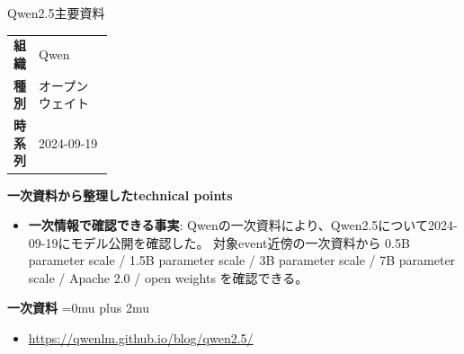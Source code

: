 \begin{technicalnote}{Qwen2.5}{主要資料}
\begingroup
\begin{tabularx}{\linewidth}{@{}>{\bfseries}p{0.22\linewidth}X@{}}
組織 & Qwen \\
種別 & オープンウェイト \\
時系列 & 2024-09-19 \\
\end{tabularx}
\smallskip
{\bfseries 一次資料から整理したtechnical points}
\begin{itemize}[leftmargin=1.5em,itemsep=0.35em]
\item \textbf{一次情報で確認できる事実}: Qwenの一次資料により、Qwen2.5について2024-09-19にモデル公開を確認した。 対象event近傍の一次資料から 0.5B parameter scale / 1.5B parameter scale / 3B parameter scale / 7B parameter scale / Apache 2.0 / open weights を確認できる。
\end{itemize}
\begin{minipage}{\linewidth}
\begin{samepage}
{\bfseries 一次資料}
\begingroup\sloppy
\Urlmuskip=0mu plus 2mu\relax
\begin{itemize}[leftmargin=1.5em,itemsep=0.25em]
\item {\scriptsize\url{https://qwenlm.github.io/blog/qwen2.5/}}
\end{itemize}
\endgroup
\end{samepage}
\end{minipage}
\endgroup
\end{technicalnote}
\medskip

